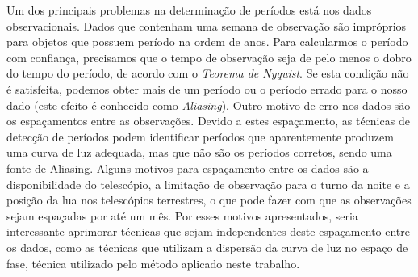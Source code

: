 Um dos principais problemas na determinação de períodos está nos dados observacionais. Dados que contenham uma semana de observação são impróprios para objetos que possuem período na ordem de anos. Para calcularmos o período com confiança, precisamos que o tempo de observação seja de pelo menos o dobro do tempo do período, de acordo com o \textit{Teorema de Nyquist}. Se esta condição não é satisfeita, podemos obter mais de um período ou o período errado para o nosso dado (este efeito é conhecido como \textit{Aliasing}). Outro motivo de erro nos dados são os espaçamentos entre as observações. Devido a estes espaçamento, as técnicas de detecção de períodos podem identificar períodos que aparentemente produzem uma curva de luz adequada, mas que não são os períodos corretos, sendo uma fonte de Aliasing. Alguns motivos para espaçamento entre os dados são a disponibilidade do telescópio, a limitação de observação para o turno da noite e a posição da lua nos telescópios terrestres, o que pode fazer com que as observações sejam espaçadas por até um mês. Por esses motivos apresentados, seria interessante aprimorar técnicas que sejam independentes deste espaçamento entre os dados, como as técnicas que utilizam a dispersão da curva de luz no espaço de fase, técnica utilizado pelo método aplicado neste trabalho.
